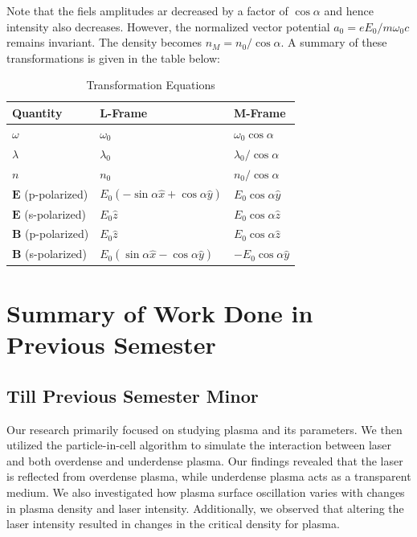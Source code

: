\documentclass[12pt]{article}
\begin{document}
Note that the fiels amplitudes ar decreased by a factor of $\cos\alpha$ and hence intensity also decreases. However, the normalized vector potential $a_0 = eE_0/m\omega_0c$ remains invariant. The density becomes $n_M = n_0/\cos\alpha$. A summary of these transformations is given in the table below:
\begin{table}[!ht]
    \centering
    \caption{Transformation Equations}
    \label{tab:transformation}
    \vspace{0.3cm}
    \begin{tabular}{|l|l|l|}
        \hline
        \textbf{Quantity}          & \textbf{L-Frame}                                 & \textbf{M-Frame}          \\ \hline
        $\omega$                   & $\omega_0$                                       & $\omega_0 \cos\alpha$     \\ \hline
        $\lambda$                  & $\lambda_0$                                      & $\lambda_0/\cos\alpha$    \\ \hline
        $n$                        & $n_0$                                            & $n_0/\cos\alpha$          \\ \hline
        $\mathbf{E}$ (p-polarized) & $E_0 (-\sin\alpha \hat{x} + \cos\alpha \hat{y})$ & $E_0 \cos\alpha \hat{y}$  \\ \hline
        $\mathbf{E}$ (s-polarized) & $E_0 \hat{z}$                                    & $E_0 \cos\alpha \hat{z}$  \\ \hline
        $\mathbf{B}$ (p-polarized) & $E_0 \hat{z}$                                    & $E_0 \cos\alpha \hat{z}$  \\ \hline
        $\mathbf{B}$ (s-polarized) & $E_0 (\sin\alpha \hat{x} - \cos\alpha \hat{y})$  & $-E_0 \cos\alpha \hat{y}$ \\ \hline
    \end{tabular}
\end{table}

\section{Summary of Work Done in Previous Semester}

\subsection{Till Previous Semester Minor}
Our research primarily focused on studying plasma and its parameters. We then utilized the particle-in-cell algorithm to simulate the interaction between laser and both overdense and underdense plasma. Our findings revealed that the laser is reflected from overdense plasma, while underdense plasma acts as a transparent medium. We also investigated how plasma surface oscillation varies with changes in plasma density and laser intensity. Additionally, we observed that altering the laser intensity resulted in changes in the critical density for plasma.
\end{document}
